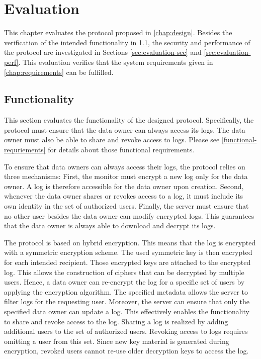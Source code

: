\documentclass[../main.tex]{subfiles}
\begin{document}
\chapter{Evaluation}
\label{chap:evaluation}

This chapter evaluates the protocol proposed in \cref{chap:design}.
Besides the verification of the intended functionality in \cref{sec:evaluation-func}, the security and performance of the protocol are investigated in Sections \ref{sec:evaluation-sec} and \ref{sec:evaluation-perf}.
This evaluation verifies that the system requirements given in \cref{chap:requirements} can be fulfilled.

\section{Functionality}
\label{sec:evaluation-func}

This section evaluates the functionality of the designed protocol.
Specifically, the protocol must ensure that the data owner can always access its logs.
The data owner must also be able to share and revoke access to logs.
Please see \cref{functional-requriements} for details about those functional requirements.

To ensure that data owners can always access their logs, the protocol relies on three mechanisms:
First, the monitor must encrypt a new log only for the data owner.
A log is therefore accessible for the data owner upon creation.
Second, whenever the data owner shares or revokes access to a log, it must include its own identity in the set of authorized users.
Finally, the server must ensure that no other user besides the data owner can modify encrypted logs.
This guarantees that the data owner is always able to download and decrypt its logs.

The protocol is based on hybrid encryption.
This means that the log is encrypted with a symmetric encryption scheme.
The used symmetric key is then encrypted for each intended recipient.
Those encrypted keys are attached to the encrypted log.
This allows the construction of ciphers that can be decrypted by multiple users.
Hence, a data owner can re-encrypt the log for a specific set of users by applying the encryption algorithm.
The specified metadata allows the server to filter logs for the requesting user.
Moreover, the server can ensure that only the specified data owner can update a log.
This effectively enables the functionality to share and revoke access to the log.
Sharing a log is realized by adding additional users to the set of authorized users.
Revoking access to logs requires omitting a user from this set.
Since new key material is generated during encryption, revoked users cannot re-use older decryption keys to access the log.
\end{document}
